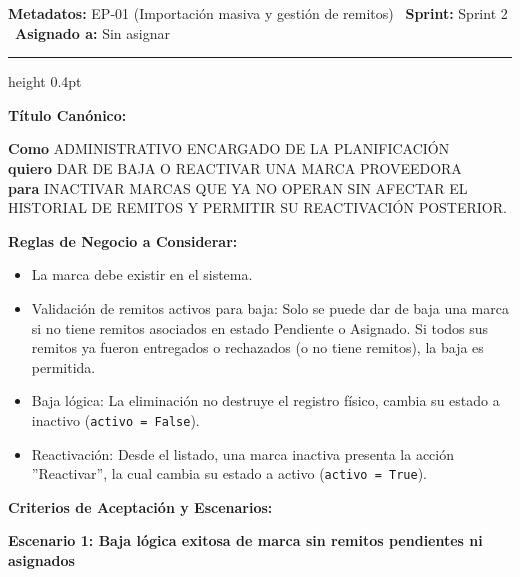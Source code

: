 \documentclass[a4paper,9pt]{article}
\begin{document}
\begin{tcolorbox}[hucard, title={\textbf{HU-242: ELIMINAR MARCA} \hfill \scriptsize \colorbox{slatestatus}{\textbf{\ Done\ }} \quad \colorbox{white}{\textcolor{primarydark}{\textbf{\ 3 pts\ }}}}]
\vspace{-1pt}
\noindent\textbf{\footnotesize Metadatos:} EP-01 (Importación masiva y gestión de remitos) \textbar\ \textbf{Sprint:} Sprint 2 \textbar\ \textbf{Asignado a:} Sin asignar\par\vspace{2pt}
\hrule height 0.4pt\par\vspace{3pt}
\noindent\textbf{\footnotesize Título Canónico:}\par\vspace{1pt}
{\small \textbf{Como} ADMINISTRATIVO ENCARGADO DE LA PLANIFICACIÓN \\ \textbf{quiero} DAR DE BAJA O REACTIVAR UNA MARCA PROVEEDORA \\ \textbf{para} INACTIVAR MARCAS QUE YA NO OPERAN SIN AFECTAR EL HISTORIAL DE REMITOS Y PERMITIR SU REACTIVACIÓN POSTERIOR.}\par\vspace{3pt}
\noindent\textbf{\footnotesize Reglas de Negocio a Considerar:}\par\vspace{1pt}
{\footnotesize
\begin{itemize}[leftmargin=12pt, nosep, itemsep=1.5pt, topsep=1pt]
\item La marca debe existir en el sistema.
\item Validación de remitos activos para baja: Solo se puede dar de baja una marca si no tiene remitos asociados en estado Pendiente o Asignado. Si todos sus remitos ya fueron entregados o rechazados (o no tiene remitos), la baja es permitida.
\item Baja lógica: La eliminación no destruye el registro físico, cambia su estado a inactivo (\texttt{activo = False}).
\item Reactivación: Desde el listado, una marca inactiva presenta la acción ''Reactivar'', la cual cambia su estado a activo (\texttt{activo = True}).
\end{itemize}
}\par\vspace{3pt}
\noindent\textbf{\footnotesize Criterios de Aceptación y Escenarios:}\par\vspace{2pt}
{\footnotesize
\noindent\textbf{\textcolor{secondarydark}{Escenario 1:  Baja lógica exitosa de marca sin remitos pendientes ni asignados}}\par\vspace{1pt}
}
\end{tcolorbox}
\end{document}
